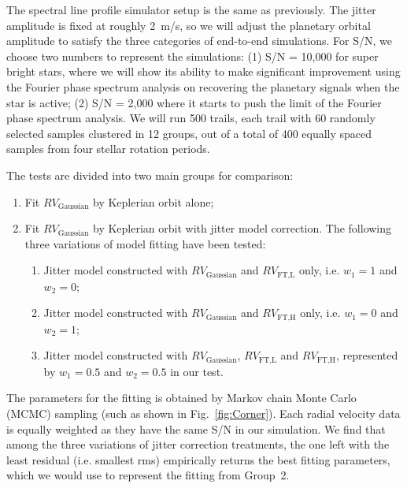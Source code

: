 The spectral line profile simulator setup is the same as previously. The jitter amplitude is fixed at roughly 2~m/s, so we will adjust the planetary orbital amplitude to satisfy the three categories of end-to-end simulations. For S/N, we choose two numbers to represent the simulations: (1) S/N = 10,000 for super bright stars, where we will show its ability to make significant improvement using the Fourier phase spectrum analysis on recovering the planetary signals when the star is active; (2) S/N = 2,000 where it starts to push the limit of the Fourier phase spectrum analysis. We will run 500 trails, each trail with 60 randomly selected samples clustered in 12 groups, out of a total of 400 equally spaced samples from four stellar rotation periods. 

The tests are divided into two main groups for comparison:
\begin{enumerate}
	\item Fit $RV_\text{Gaussian}$ by Keplerian orbit alone;
	\item Fit $RV_\text{Gaussian}$ by Keplerian orbit with jitter model correction. The following three variations of model fitting have been tested:
   \begin{enumerate}
     \item Jitter model constructed with $RV_\text{Gaussian}$ and $RV_\text{FT,L}$ only, i.e. $w_1=1$ and $w_2=0$;
     \item Jitter model constructed with $RV_\text{Gaussian}$ and $RV_\text{FT,H}$ only, i.e. $w_1=0$ and $w_2=1$;
     \item Jitter model constructed with $RV_\text{Gaussian}$, $RV_\text{FT,L}$ and $RV_\text{FT,H}$, represented by $w_1=0.5$ and $w_2=0.5$ in our test. 
   \end{enumerate}
\end{enumerate}
The parameters for the fitting is obtained by Markov chain Monte Carlo (MCMC) sampling (such as shown in Fig.~\ref{fig:Corner}). Each radial velocity data is equally weighted as they have the same S/N in our simulation. We find that among the three variations of jitter correction treatments, the one left with the least residual (i.e. smallest rms) empirically returns the best fitting parameters, which we would use to represent the fitting from Group~2. 

